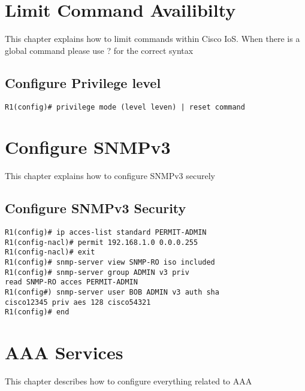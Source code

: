 \section{Limit Command Availibilty}
This chapter explains how to limit commands within Cisco IoS. 
When there is a global command please use ? for the correct syntax 

\subsection{Configure Privilege level}
\begin{verbatim}
R1(config)# privilege mode (level leven) | reset command 
\end{verbatim}

\section{Configure SNMPv3}
This chapter explains how to configure SNMPv3 securely

\subsection{Configure SNMPv3 Security}

\begin{verbatim}
R1(config)# ip acces-list standard PERMIT-ADMIN 
R1(config-nacl)# permit 192.168.1.0 0.0.0.255
R1(config-nacl)# exit
R1(config)# snmp-server view SNMP-RO iso included 
R1(config)# snmp-server group ADMIN v3 priv 
read SNMP-RO acces PERMIT-ADMIN
R1(config#) snmp-server user BOB ADMIN v3 auth sha 
cisco12345 priv aes 128 cisco54321
R1(config)# end 
\end{verbatim}

\section{AAA Services}
This chapter describes how to configure everything related to AAA
